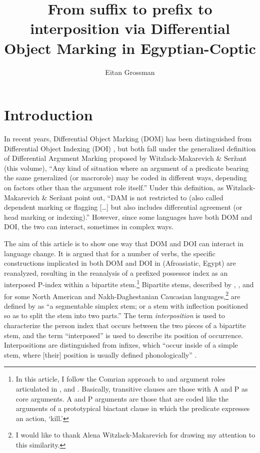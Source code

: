\documentclass[output=paper]{LSP/langsci}
\author{Eitan Grossman\affiliation{The Hebrew University of Jerusalem }} %
\title{From suffix to prefix to interposition via Differential Object Marking in Egyptian-Coptic}
\begin{document}
\section{Introduction}
\label{05-sec:1}

In recent years, Differential Object Marking (DOM) has been distinguished from Differential Object Indexing (DOI) \citep{Iemmolo2011Towards}, but both fall under the generalized definition of Differential Argument Marking proposed by Witzlack-Makarevich \& Seržant (this volume), \ie “Any kind of situation where an argument of a predicate bearing the same generalized  (or macrorole) may be coded in different ways, depending on factors other than the argument role itself.” Under this definition, as Witzlack-Makarevich \& Seržant point out, “DAM is not restricted to  (also called dependent marking or flagging […] but also includes differential agreement (or head marking or indexing).” However, since some languages have both DOM and DOI, the two can interact, sometimes in complex ways.

 The aim of this article is to show one way that DOM and DOI can interact in language change. It is argued that for a number of verbs, the specific constructions implicated in both DOM and DOI in  (Afroasiatic, Egypt) are reanalyzed, resulting in the reanalysis of a prefixed possessor index as an interposed P-index within a bipartite stem.\footnote{In this article, I follow the Comrian approach to  and argument roles articulated in \citet{Comrie1981Language}, \citet{Lazard2002Transitivity} and \citet{Haspelmath2011S}. Basically, transitive clauses are those with A and P as core arguments. A and P arguments are those that are coded like the arguments of a prototypical biactant clause in which the predicate expresses an action, \eg ‘kill.’} Bipartite stems, described by \citet{Jacobsen1980Washo}, \citet{DeLancey1996Penutian}, and \citet{Nichols2003Bipartite} for some North American and Nakh-Daghestanian Caucasian languages,\footnote{I would like to thank Alena Witzlack-Makarevich for drawing my attention to this similarity.} are defined by \citet[321]{Nichols2003Bipartite} as “a segmentable simplex stem; or a stem with inflection positioned so as to split the stem into two parts.” The term \textit{interposition} is used to characterize the person index that occurs between the two pieces of a bipartite stem, and the term “interposed” is used to describe its position of occurrence. Interpositions are distinguished from infixes, which “occur inside of a simple stem, where [their] position is usually defined phonologically” \citep[321]{Nichols2003Bipartite}.
\end{document}
